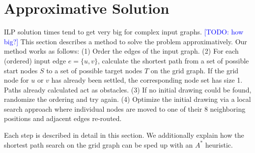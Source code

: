 \documentclass[sigconf]{acmart}
\newcommand\TODO[1]{\textcolor{blue}{\small [TODO: #1]}}
\begin{document}
\section{Approximative Solution}

ILP solution times tend to get very big for complex input graphs. \TODO{how big?}
This section describes a method to solve the problem approximatively.
Our method works as follows:
  (1) Order the edges of the input graph.
  (2) For each (ordered) input edge $e = \{u, v\}$, calculate the shortest path from a set of possible start nodes $S$ to a set of possible target nodes $T$ on the grid graph. If the grid node for $u$ or $v$ has already been settled, the corresponding node set has size 1. Paths already calculated act as obstacles.
  (3) If no initial drawing could be found, randomize the ordering and try again.
  (4) Optimize the initial drawing via a local search approach where individual nodes are moved to one of their 8 neighboring positions and adjacent edges re-routed.

Each step is described in detail in this section.
We additionally explain how the shortest path search on the grid graph can be sped up with an $A^*$ heuristic.
\end{document}

